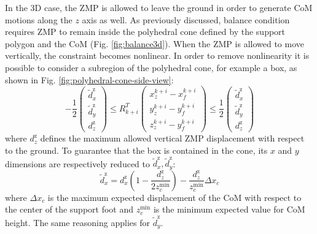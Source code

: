 In the 3D case, the ZMP is allowed to leave the ground in order to
generate CoM motions along the $z$ axis as well.
As previously discussed, balance condition requires ZMP to remain inside the
polyhedral cone defined by the support polygon and the CoM
(Fig. \ref{fig:balance3d}). When the ZMP is allowed to move vertically,
the constraint becomes nonlinear. In order to remove nonlinearity it is 
possible to consider a subregion of the polyhedral cone, for example a box,
as shown in Fig. \ref{fig:polyhedral-cone-side-view}:
\begin{equation}
  \label{eq:zmp-constraint-3d}
  -\frac{1}{2}
  \begin{pmatrix}
    \tilde{d}_x^\text{z} \\
    \tilde{d}_y^\text{z} \\
    d_z^\text{z}
  \end{pmatrix}
  \le
  R_{k+i}^T
  \begin{pmatrix}
    x_z^{k+i} - x_f^{k+i} \\
    y_z^{k+i} - y_f^{k+i} \\
    z_z^{k+i} - y_f^{k+i}
  \end{pmatrix}
  \le
  \frac{1}{2}
  \begin{pmatrix}
    \tilde{d}_x^\text{z} \\
    \tilde{d}_y^\text{z} \\
    d_z^\text{z}
  \end{pmatrix}
\end{equation}
where $d_z^\text{z}$ defines the maximum allowed vertical ZMP displacement
with respect to the ground.
To guarantee that the box is contained in the cone, its $x$ and $y$ dimensions 
are respectively reduced to $\tilde{d}_x^\text{z}, \tilde{d}_y^\text{z}$:
\begin{equation}
  \tilde{d}_x^\text{z} = d_x^\text{z} \left( 1 -
      \frac{d_z^\text{z}}{2z_c^{\min}} \right)
      - \frac{d_z^\text{z}}{z_c^{\min}}\Delta x_c
\end{equation}
where $\Delta x_c$ is the maximum expected displacement of the CoM with respect 
to the center of the support foot and $z_c^{\min}$ is the minimum expected
value for CoM height. The same reasoning applies for $\tilde{d}_y^\text{z}$.
